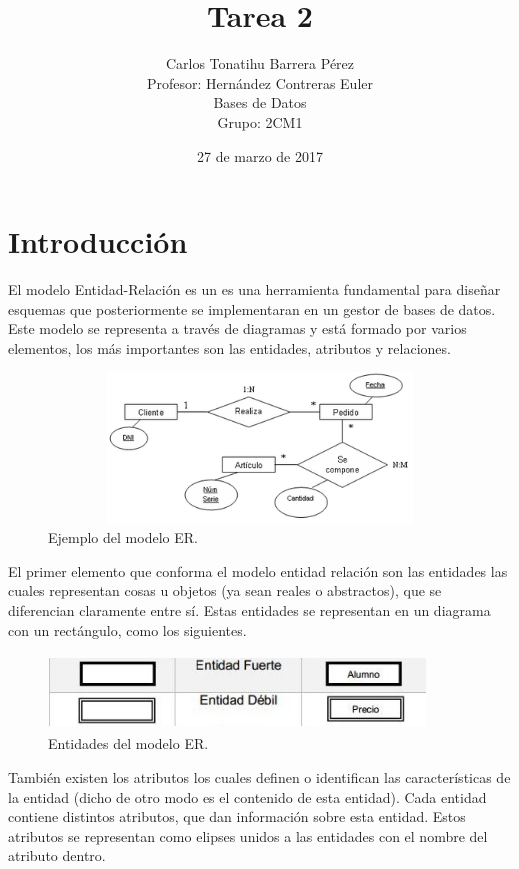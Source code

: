 \documentclass[12pt, titlepage]{article}
\title{Tarea 2}
\author{Carlos Tonatihu Barrera Pérez \\ Profesor: Hernández Contreras Euler \\ Bases de Datos \\ Grupo: 2CM1 }
\date{27 de marzo de 2017}
\begin{document}
	\maketitle
	\tableofcontents
	\section{Introducción}
	El modelo Entidad-Relación es un es una herramienta fundamental para diseñar esquemas que posteriormente se implementaran en un gestor de bases de datos. Este modelo se representa a través de diagramas y está formado por varios elementos, los más importantes son las entidades, atributos y relaciones.\cite{LIBRO}
	
	\begin{figure}[H]
		\begin{center}
			\includegraphics[width=12cm, height=4cm]{img/modelo.png}
			\caption{Ejemplo del modelo ER.}
			\label{fig:hasta-use}
		\end{center}
	\end{figure}
	
	El primer elemento que conforma el modelo entidad relación son las entidades las cuales representan cosas u objetos (ya sean reales o abstractos), que se diferencian claramente entre sí. Estas entidades se representan en un diagrama con un rectángulo, como los siguientes.
	
	\begin{figure}[H]
		\begin{center}
			\includegraphics[width=10cm, height=2cm]{img/entidad1.jpg}
			\caption{Entidades del modelo ER.}
			\label{fig:hasta-use1}
		\end{center}
	\end{figure}
	
	También existen los atributos los cuales definen o identifican las características de la entidad (dicho de otro modo es el contenido de esta entidad). Cada entidad contiene distintos atributos, que dan información sobre esta entidad. Estos atributos se representan como elipses unidos a las entidades con el nombre del atributo dentro.\cite{WEB}
	
\end{document}
